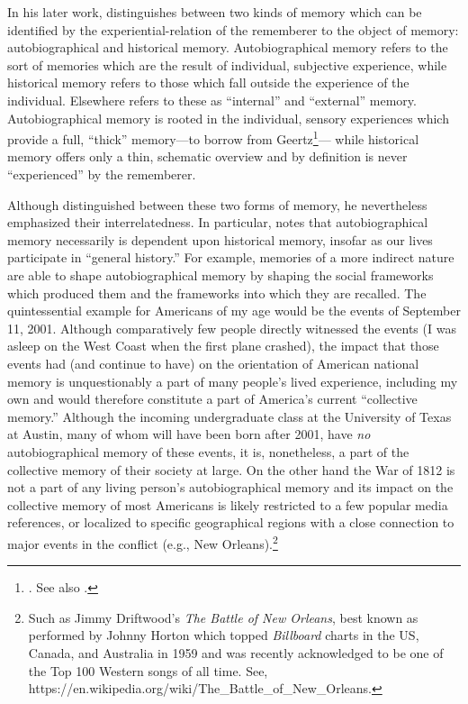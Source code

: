 In his later work, \halbwachs distinguishes between two kinds of memory which can be identified by the experiential-relation of the rememberer to the object of memory: autobiographical and historical memory.\autocite[52]{halbwachs1980} Autobiographical memory refers to the sort of memories which are the result of individual, subjective experience, while historical memory refers to those which fall outside the experience of the individual. Elsewhere \halbwachs refers to these as ``internal'' and ``external'' memory. Autobiographical memory is rooted in the individual, sensory experiences which provide a full, ``thick'' memory---to borrow from Geertz\footnote{\Cite[3--30]{geertz1973}. See also \cite[189--192]{smith-riley2009}.}--- while historical memory offers only a thin, schematic overview and by definition is never ``experienced'' by the rememberer.  

Although \halbwachs distinguished between these two forms of memory, he nevertheless emphasized their interrelatedness. In particular, \halbwachs notes that autobiographical memory necessarily is dependent upon historical memory, insofar as our lives participate in ``general history.''\autocite[52]{halbwachs1980} For example, memories of a more indirect nature are able to shape autobiographical memory by shaping the social frameworks which produced them and the frameworks into which they are recalled. The quintessential example for Americans of my age would be the events of September 11, 2001. Although comparatively few people directly witnessed the events (I was asleep on the West Coast when the first plane crashed), the impact that those events had (and continue to have) on the orientation of American national memory is unquestionably a part of many people's lived experience, including my own and would therefore constitute a part of America's current ``collective memory.'' Although the incoming undergraduate class at the University of Texas at Austin, many of whom will have been born after 2001, have \emph{no} autobiographical memory of these events, it is, nonetheless, a part of the collective memory of their society at large. On the other hand the War of 1812 is not a part of any living person's autobiographical memory and its impact on the collective memory of most Americans is likely restricted to a few popular media references, or localized to specific geographical regions with a close connection to major events in the conflict (e.g., New Orleans).\footnote{Such as Jimmy Driftwood's \emph{The Battle of New   Orleans}, best known as performed by Johnny Horton which topped   \emph{Billboard} charts in the US, Canada, and Australia in 1959 and   was recently acknowledged to be one of the Top 100 Western songs of   all time. See,   https://en.wikipedia.org/wiki/The\_Battle\_of\_New\_Orleans.}  

